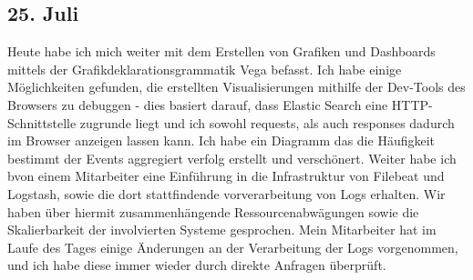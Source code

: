 \subsection{25. Juli}
Heute habe ich mich weiter mit dem Erstellen von Grafiken und Dashboards mittels der Grafikdeklarationsgrammatik Vega befasst. Ich habe einige Möglichkeiten gefunden, die erstellten Visualisierungen mithilfe der Dev-Tools des Browsers zu debuggen - dies basiert darauf, dass Elastic Search eine HTTP-Schnittstelle zugrunde liegt und ich sowohl requests, als auch responses dadurch im Browser anzeigen lassen kann. Ich habe ein Diagramm das die Häufigkeit bestimmt der Events aggregiert verfolg erstellt und verschönert. Weiter habe ich bvon einem Mitarbeiter eine Einführung in die Infrastruktur von Filebeat und Logstash, sowie die dort stattfindende vorverarbeitung von Logs erhalten. Wir haben über hiermit zusammenhängende Ressourcenabwägungen sowie die Skalierbarkeit der involvierten Systeme gesprochen. Mein Mitarbeiter hat im Laufe des Tages einige Änderungen an der Verarbeitung der Logs vorgenommen, und ich habe diese immer wieder durch direkte Anfragen überprüft.